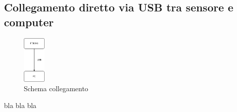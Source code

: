 \subsection{Collegamento diretto via USB tra sensore e computer}
\begin{figure}[H]
    \centering
    \includegraphics*[width=0.1\textwidth]{images/ft-pc.png}
    \caption{Schema collegamento}
    \label{fig:ft-pc}
\end{figure}
bla bla bla

